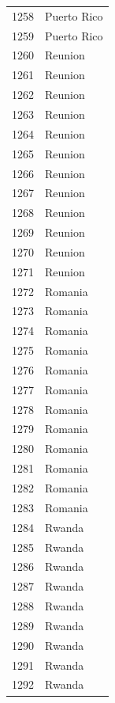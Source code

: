 \documentclass[
  letterpaper,
  DIV=11,
  numbers=noendperiod]{scrreprt}
\begin{document}
\begin{tabular}{ll}
1258 &               Puerto Rico \\
1259 &               Puerto Rico \\
1260 &                   Reunion \\
1261 &                   Reunion \\
1262 &                   Reunion \\
1263 &                   Reunion \\
1264 &                   Reunion \\
1265 &                   Reunion \\
1266 &                   Reunion \\
1267 &                   Reunion \\
1268 &                   Reunion \\
1269 &                   Reunion \\
1270 &                   Reunion \\
1271 &                   Reunion \\
1272 &                   Romania \\
1273 &                   Romania \\
1274 &                   Romania \\
1275 &                   Romania \\
1276 &                   Romania \\
1277 &                   Romania \\
1278 &                   Romania \\
1279 &                   Romania \\
1280 &                   Romania \\
1281 &                   Romania \\
1282 &                   Romania \\
1283 &                   Romania \\
1284 &                    Rwanda \\
1285 &                    Rwanda \\
1286 &                    Rwanda \\
1287 &                    Rwanda \\
1288 &                    Rwanda \\
1289 &                    Rwanda \\
1290 &                    Rwanda \\
1291 &                    Rwanda \\
1292 &                    Rwanda \\

\end{tabular}
\end{document}
